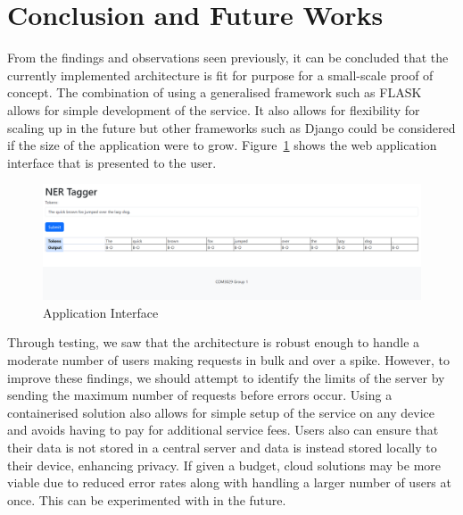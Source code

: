 \documentclass{surreydissertation}
\begin{document}
\section{Conclusion and Future Works}
From the findings and observations seen previously, it can be concluded that the currently implemented architecture is fit for purpose for a small-scale proof of concept. The combination of using a generalised framework such as FLASK~\cite{flask} allows for simple development of the service. It also allows for flexibility for scaling up in the future but other frameworks such as Django could be considered if the size of the application were to grow. Figure~\ref{fig:interface} shows the web application interface that is presented to the user.

\begin{figure}[H]
    \centering
    \includegraphics[width=1.0\linewidth]{Figures/frontend.png}
    \caption{Application Interface}
    \label{fig:interface}
 \end{figure}

Through testing, we saw that the architecture is robust enough to handle a moderate number of users making requests in bulk and over a spike. However, to improve these findings, we should attempt to identify the limits of the server by sending the maximum number of requests before errors occur. Using a containerised solution also allows for simple setup of the service on any device and avoids having to pay for additional service fees. Users also can ensure that their data is not stored in a central server and data is instead stored locally to their device, enhancing privacy. If given a budget, cloud solutions may be more viable due to reduced error rates along with handling a larger number of users at once. This can be experimented with in the future.

\appendix
%
%



\end{document}
